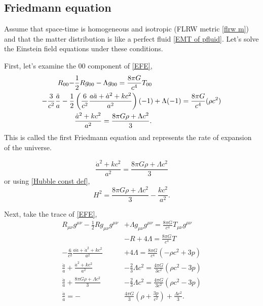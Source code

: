 \documentclass[12pt]{article}
\newcommand{\tcb}[2]{\begin{tcolorbox}[title={\textcolor{white}{#1}}, opacitybacktitle = 0, colframe=white!40!black]#2
\end{tcolorbox}}
\numberwithin{equation}{section}
\begin{document}
\subsection{Friedmann equation}
Assume that space-time is homogeneous and isotropic (FLRW metric \eqref{flrw m}) and that the matter distribution is like a perfect fluid \eqref{EMT of pfluid}. Let's solve the Einstein field equations under these conditions.\par
First, let's examine the $00$ component of \eqref{EFE},
\begin{align*}
    R_{00} -&\frac{1}{2}Rg_{00} -\Lambda g_{00} = \frac{8\pi G}{c^4}T_{00} \notag\\
    -\frac{3}{c^2}\frac{\ddot{a}}{a} -\frac{1}{2}&\left( \frac{6}{c^2}\frac{a\ddot{a} + \dot{a}^2 + kc^2}{a^2} \right)(-1)+\Lambda (-1) = \frac{8\pi G}{c^4}(\rho c^2) \notag\\
    &\frac{\dot{a}^2 + kc^2}{a^2} = \frac{8\pi G\rho + \Lambda c^2}{3}.
\end{align*}
This is called the first Friedmann equation and represents the rate of expansion of the universe.
\tcb{First Friedmann equation (universe expansion rate)}{
    \begin{equation}\label{Friedmann eq1}
        \frac{\dot{a}^2 + kc^2}{a^2} = \frac{8\pi G\rho + \Lambda c^2}{3}
    \end{equation}
    \hspace{2cm}or using \eqref{Hubble const def},
    \begin{equation}\label{Friedmann eq1_H}
        H^2 = \frac{8\pi G\rho + \Lambda c^2}{3} -\frac{kc^2}{a^2}.
    \end{equation}
}
\noindent Next, take the trace of \eqref{EFE},
\begin{align*}
    R_{\mu\nu}g^{\mu\nu} -\frac{1}{2}Rg_{\mu\nu}g^{\mu\nu} &+ \Lambda g_{\mu\nu}g^{\mu\nu} = \frac{8\pi G}{c^4}T_{\mu\nu}g^{\mu\nu}\\
    &-R + 4\Lambda = \frac{8\pi G}{c^4}T\\
    -\frac{6}{c^2}\frac{a\ddot{a} + \dot{a}^2 + kc^2}{a^2} &+ 4\Lambda = \frac{8\pi G}{c^4}(-\rho c^2 + 3p)\\
    \frac{\ddot{a}}{a} + \frac{\dot{a}^2 + kc^2}{a^2} &-\frac{2}{3}\Lambda c^2 = \frac{4\pi G}{3c^2}(\rho c^2 -3p)\\
    \frac{\ddot{a}}{a} + \frac{8\pi G\rho + \Lambda c^2}{3} &-\frac{2}{3}\Lambda c^2 = \frac{4\pi G}{3c^2}(\rho c^2 -3p)\\
    \frac{\ddot{a}}{a} = -&\frac{4\pi G}{3}\left( \rho + \frac{3p}{c^2} \right) + \frac{\Lambda c^2}{3}.
\end{align*}
\end{document}
